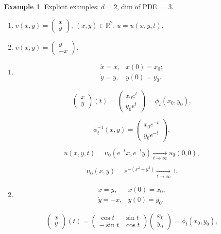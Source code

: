 \documentclass[12pt]{article}
\theoremstyle{definition}
\newtheorem*{example*}{Example}
\begin{document}
\begin{example*}
Explicit examples: $d=2$, dim of PDE $=3$.

\begin{enumerate}[label=\arabic*)]
\item $v(x,y)=\left(\begin{matrix}x\\y\end{matrix}\right)$, $(x,y)\in\mathbb R^2$, $u=u(x,y,t)$.

\item $v(x,y)=\left(\begin{matrix}y\\-x\end{matrix}\right)$.
\end{enumerate}

\begin{enumerate}[label=\arabic*)]
\item
\[
\begin{array}{ll}
\dot x=x,&x(0)=x_0;\\\dot y=y,&y(0)=y_0.
\end{array}
\]

\[\left(\begin{matrix}x\\y\end{matrix}\right)(t)=\left(\begin{matrix}x_0e^t\\y_0e^t\end{matrix}\right)=\phi_t(x_0,y_0),\]

\[\phi_t^{-1}(x,y)=\left(\begin{matrix}x_0e^{-t}\\y_0e^{-t}\end{matrix}\right),\]

\[u(x,y,t)=u_0(e^{-t}x,e^{-t}y)\xrightarrow[t\to\infty]{}u_0(0,0),\]

\[u_0(x,y)=e^{-(x^2+y^2)}\xrightarrow[t\to\infty]{}1.\]

\item
\[
\begin{array}{ll}
\dot x=y,&x(0)=x_0;\\
\dot y=-x,&y(0)=y_0.
\end{array}
\]

\[\left(\begin{matrix}x\\y\end{matrix}\right)(t)=\left(\begin{matrix}\cos t&\sin t\\-\sin t&\cos t\end{matrix}\right)\left(\begin{matrix}x_0\\y_0\end{matrix}\right)=\phi_t(x_0,y_0),\]


\end{enumerate}
\end{example*}
\end{document}
